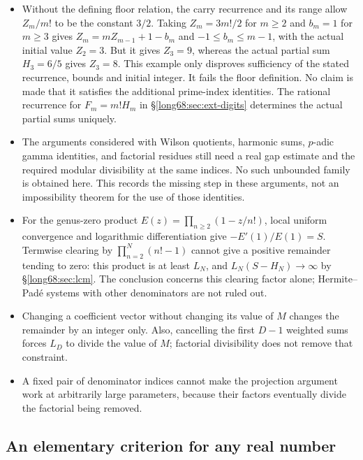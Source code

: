 \documentclass[11pt]{article}
\newcommand{\Ser}{S}
\begin{document}
\begin{itemize}
\item Without the defining floor relation, the carry recurrence and its
  range allow $Z_m/m!$ to be the constant $3/2$. Taking $Z_m=3m!/2$ for
  $m\ge2$ and $b_m=1$ for $m\ge3$ gives
  $Z_m=mZ_{m-1}+1-b_m$ and $-1\le b_m\le m-1$, with the actual initial
  value $Z_2=3$. But it gives $Z_3=9$, whereas the actual partial sum
  $H_3=6/5$ gives $Z_3=8$. This example only disproves sufficiency of
  the stated recurrence, bounds and initial integer. It fails the floor
  definition. No claim is made that it satisfies the additional prime-index
  identities. The rational recurrence for $F_m=m!H_m$ in
  \S\ref{long68:sec:ext-digits} determines the actual partial sums uniquely.
\item The arguments considered with Wilson quotients, harmonic sums,
  $p$-adic gamma identities, and factorial residues still need a real
  gap estimate and the required modular divisibility at the same indices.
  No such unbounded family is obtained here. This records the missing
  step in these arguments, not an impossibility theorem for the use of
  those identities.
\item For the genus-zero product $E(z)=\prod_{n\ge2}(1-z/n!)$, local uniform
  convergence and logarithmic differentiation give $-E'(1)/E(1)=\Ser$.
  Termwise clearing by $\prod_{n=2}^N(n!-1)$ cannot give a positive
  remainder tending to zero: this product is at least $L_N$, and
  $L_N(\Ser-H_N)\to\infty$ by \S\ref{long68:sec:lcm}. The conclusion concerns
  this clearing factor alone; Hermite--Pad\'e systems with other
  denominators are not ruled out.
\item Changing a coefficient vector without changing its value of $M$ changes
  the remainder by an integer only. Also, cancelling the first $D-1$ weighted
  sums forces $L_D$ to divide the value of $M$; factorial divisibility does not
  remove that constraint.
\item A fixed pair of denominator indices cannot make the projection
  argument work at arbitrarily large parameters, because their factors
  eventually divide the factorial being removed.
\end{itemize}

\subsection{An elementary criterion for any real number}
\label{long68:sec:ext-generic}
\end{document}
